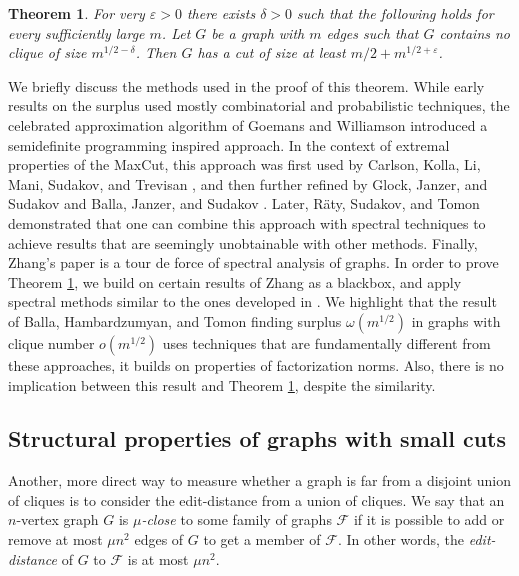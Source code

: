 \documentclass[11pt]{article}
\theoremstyle{plain}
\newtheorem{theorem}{Theorem}[section]
\theoremstyle{definition}
\newcommand{\cF}{\mathcal{F}}
\newcommand{\eps}{\varepsilon}
\begin{document}
\begin{theorem}\label{thm:maxcut}
For very $\eps>0$ there exists $\delta>0$ such that the following holds for every sufficiently large $m$. Let $G$ be a graph with $m$ edges such that $G$ contains no clique of size $m^{1/2-\delta}$. Then $G$ has a cut of size at least $m/2+m^{1/2+\eps}$. 
\end{theorem}

We briefly discuss the methods used in the proof of this theorem. While early results on the surplus used mostly combinatorial and probabilistic techniques, the celebrated approximation algorithm of Goemans and Williamson \cite{GW95} introduced a semidefinite programming inspired approach. In the context of extremal properties of the MaxCut, this approach was first used by Carlson, Kolla, Li, Mani, Sudakov, and Trevisan \cite{CKLMST}, and then further refined by Glock, Janzer, and Sudakov \cite{GJS} and Balla, Janzer, and Sudakov \cite{BJS}. Later, R\"aty, Sudakov, and Tomon \cite{RST} demonstrated that one can combine this approach with spectral techniques to achieve results that are seemingly unobtainable with other methods. Finally, Zhang's \cite{Zhang} paper is a tour de force of spectral analysis of graphs. In order to prove Theorem \ref{thm:maxcut}, we build on certain results of Zhang as a blackbox, and apply spectral methods similar to the ones developed in \cite{RST}. We highlight that the result of Balla, Hambardzumyan, and Tomon \cite{BHT} finding surplus $\omega(m^{1/2})$ in graphs with clique number $o(m^{1/2})$ uses techniques that are fundamentally different from these approaches, it builds on properties of factorization norms. Also, there is no implication between this result and Theorem \ref{thm:maxcut}, despite the similarity.

\subsection{Structural properties of graphs with small cuts}

Another, more direct way to measure whether a graph is far from a disjoint union of cliques is to consider the edit-distance from a union of cliques. We say that an $n$-vertex graph $G$ is \emph{$\mu$-close} to some family of graphs $\cF$ if it is possible to add or remove at most $\mu n^2$ edges of $G$ to get a member of $\mathcal{F}$. In other words, the \emph{edit-distance} of $G$ to $\cF$ is at most $\mu n^2$.
\end{document}
